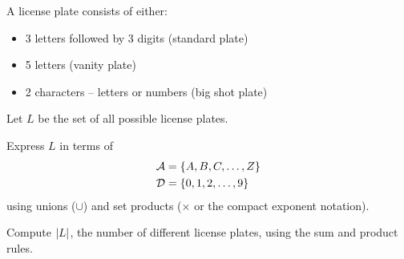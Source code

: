 \documentclass[11pt,twoside]{article}
\begin{document}
\instatements{\newpage}

\begin{problem}[4]
A license plate consists of either:

\begin{itemize}

\item 3 letters followed by 3 digits (standard plate)

\item 5 letters (vanity plate)

\item 2 characters -- letters or numbers (big shot plate)


\end{itemize}

Let $L$ be the set of all possible license plates.

\begin{problemparts}

\problempart[2] Express $L$ in terms of
%
\begin{align*}
{\cal A} & = \left\{ A, B, C, \dots, Z\right\} \\
{\cal D} & = \left\{ 0, 1, 2, \dots, 9\right\} \\
\end{align*}
%
using unions ($\cup$) and set products ($\times$ or the compact exponent notation).

\solution[\vspace{1.5in}]{
\[
L = (A^3 \times D^3) \union A^5 \union (A\union D)^2
\]
}

\problempart[2] Compute $\left|L\right|$, the number of different license plates,
using the sum and product rules.


\end{problemparts}
\end{problem}
\end{document}

